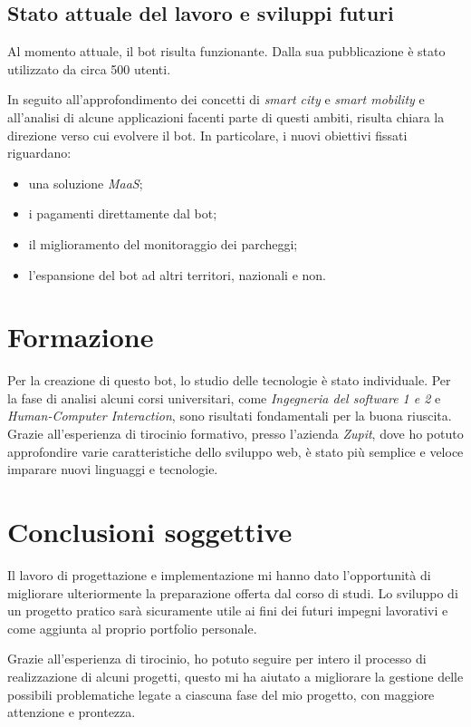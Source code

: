 \subsection{Stato attuale del lavoro e sviluppi futuri}

Al momento attuale, il bot risulta funzionante. Dalla sua pubblicazione è stato utilizzato da circa 500 utenti. 

In seguito all'approfondimento dei concetti di \textit{smart city} e \textit{smart mobility} e all'analisi di alcune applicazioni facenti parte di questi ambiti, risulta chiara la direzione verso cui evolvere il bot. In particolare, i nuovi obiettivi fissati riguardano: 
\begin{itemize}
    \item una soluzione \textit{MaaS}; 
    \item i pagamenti direttamente dal bot; 
    \item il miglioramento del monitoraggio dei parcheggi; 
    \item l'espansione del bot ad altri territori, nazionali e non. 
\end{itemize}

\section{Formazione}

Per la creazione di questo bot, lo studio delle tecnologie è stato individuale. Per la fase di analisi alcuni corsi universitari, come \textit{Ingegneria del software 1 e 2} e \textit{Human-Computer Interaction}, sono risultati fondamentali per la buona riuscita. 
Grazie all'esperienza di tirocinio formativo,  presso l'azienda \textit{Zupit}, dove ho potuto approfondire varie caratteristiche dello sviluppo web, è stato più semplice e veloce imparare nuovi linguaggi e tecnologie.

\section{Conclusioni soggettive}

Il lavoro di progettazione e implementazione mi hanno dato l'opportunità di migliorare ulteriormente la preparazione offerta dal corso di studi. Lo sviluppo di un progetto pratico sarà sicuramente utile ai fini dei futuri impegni lavorativi e come aggiunta al proprio portfolio personale. 

Grazie all'esperienza di tirocinio, ho potuto seguire per intero il processo di realizzazione di alcuni progetti, questo mi ha aiutato a migliorare la gestione delle possibili problematiche legate a ciascuna fase del mio progetto, con maggiore attenzione e prontezza. 